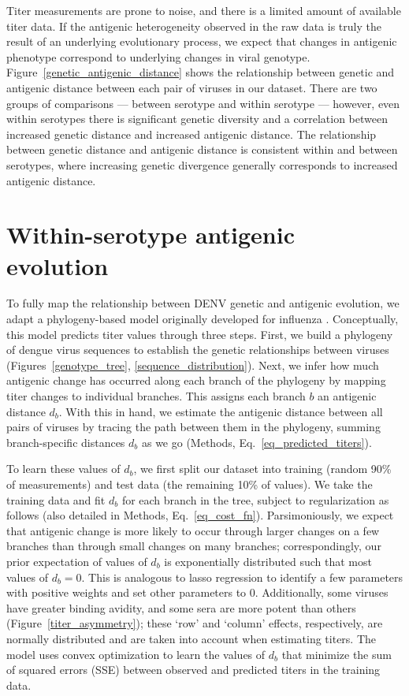 Titer measurements are prone to noise, and there is a limited amount of available titer data.
If the antigenic heterogeneity observed in the raw data is truly the result of an underlying evolutionary process, we expect that changes in antigenic phenotype correspond to underlying changes in viral genotype.
Figure~\ref{genetic_antigenic_distance} shows the relationship between genetic and antigenic distance between each pair of viruses in our dataset.
There are two groups of comparisons --- between serotype and within serotype --- however, even within serotypes there is significant genetic diversity and a correlation between increased genetic distance and increased antigenic distance.
The relationship between genetic distance and antigenic distance is consistent within and between serotypes, where increasing genetic divergence generally corresponds to increased antigenic distance.

\section{Within-serotype antigenic evolution}
To fully map the relationship between DENV genetic and antigenic evolution, we adapt a phylogeny-based model originally developed for influenza \citep{neher2016prediction}.
Conceptually, this model predicts titer values through three steps.
First, we build a phylogeny of dengue virus sequences to establish the genetic relationships between viruses (Figures~\ref{genotype_tree}, \ref{sequence_distribution}).
Next, we infer how much antigenic change has occurred along each branch of the phylogeny by mapping titer changes to individual branches.
This assigns each branch $b$ an antigenic distance $d_b$.
With this in hand, we estimate the antigenic distance between all pairs of viruses by tracing the path between them in the phylogeny, summing branch-specific distances $d_b$ as we go (Methods, Eq.~\ref{eq_predicted_titers}).

To learn these values of $d_b$, we first split our dataset into training (random 90\% of measurements) and test data (the remaining 10\% of values).
We take the training data and fit $d_b$ for each branch in the tree, subject to regularization as follows (also detailed in Methods, Eq.~\ref{eq_cost_fn}).
Parsimoniously, we expect that antigenic change is more likely to occur through larger changes on a few branches than through small changes on many branches; correspondingly, our prior expectation of values of $d_b$ is exponentially distributed such that most values of $d_b = 0$.
This is analogous to lasso regression to identify a few parameters with positive weights and set other parameters to 0.
Additionally, some viruses have greater binding avidity, and some sera are more potent than others (Figure~\ref{titer_asymmetry}); these `row' and `column' effects, respectively, are normally distributed and are taken into account when estimating titers.
The model uses convex optimization to learn the values of $d_b$ that minimize the sum of squared errors (SSE) between observed and predicted titers in the training data.

